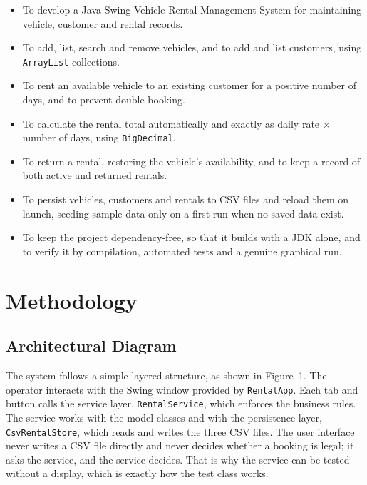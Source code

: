 \documentclass[11pt,a4paper]{article}
\begin{document}
\begin{itemize}
  \item To develop a Java Swing Vehicle Rental Management System for
        maintaining vehicle, customer and rental records.
  \item To add, list, search and remove vehicles, and to add and list
        customers, using \texttt{ArrayList} collections.
  \item To rent an available vehicle to an existing customer for a
        positive number of days, and to prevent double-booking.
  \item To calculate the rental total automatically and exactly as
        daily rate $\times$ number of days, using \texttt{BigDecimal}.
  \item To return a rental, restoring the vehicle's availability, and
        to keep a record of both active and returned rentals.
  \item To persist vehicles, customers and rentals to CSV files and
        reload them on launch, seeding sample data only on a first
        run when no saved data exist.
  \item To keep the project dependency-free, so that it builds with
        a JDK alone, and to verify it by compilation, automated
        tests and a genuine graphical run.
\end{itemize}

\section{Methodology}

\subsection{Architectural Diagram}

The system follows a simple layered structure, as shown in
Figure~1. The operator interacts with the Swing window provided by
\texttt{RentalApp}. Each tab and button calls the service layer,
\texttt{RentalService}, which enforces the business rules. The
service works with the model classes and with the persistence layer,
\texttt{CsvRentalStore}, which reads and writes the three CSV files.
The user interface never writes a CSV file directly and never
decides whether a booking is legal; it asks the service, and the
service decides. That is why the service can be tested without a
display, which is exactly how the test class works.
\end{document}
